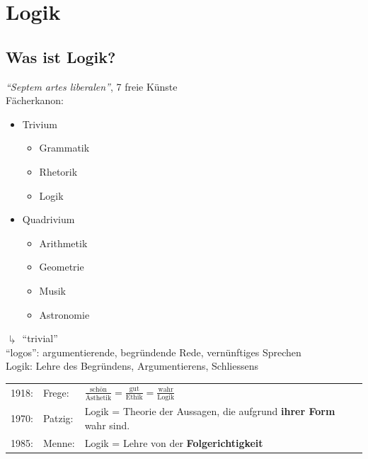 \chapter{Logik}
\section{Was ist Logik?}
\textit{\enquote{Septem artes liberalen}}, 7 freie Künste \\
Fächerkanon:
\begin{itemize}
	\item Trivium
	\begin{itemize}
		\item Grammatik
		\item Rhetorik
		\item Logik
	\end{itemize}
	\item Quadrivium
	\begin{itemize}
		\item Arithmetik
		\item Geometrie
		\item Musik
		\item Astronomie
	\end{itemize}
\end{itemize}
$\drsh$ \enquote{trivial} \\
\enquote{logos}: argumentierende, begründende Rede, vernünftiges Sprechen \\
Logik: Lehre des Begründens, Argumentierens, Schliessens \\
\begin{tabular}{lll}
	1918:	& Frege:	& $\frac{\text{schön}}{\text{Ästhetik}} = \frac{\text{gut}}{\text{Ethik}} = \frac{\text{wahr}}{\text{Logik}}$ \\
	1970:	& Patzig:	& Logik = Theorie der Aussagen, die aufgrund \textbf{ihrer Form} wahr sind. \\
	1985:	& Menne:	& Logik = Lehre von der \textbf{Folgerichtigkeit}
\end{tabular}
